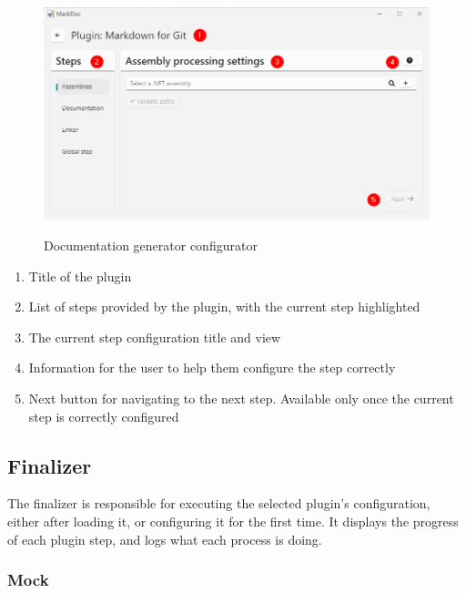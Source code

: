 \begin{figure}[H]
    \includegraphics[width=\linewidth]{img/markDocConfigurator.png}
    \label{fig:configuratorPage}
    \caption{Documentation generator configurator}
\end{figure}

\begin{enumerate}
    \item Title of the plugin
    \item List of steps provided by the plugin, with the current step highlighted
    \item The current step configuration title and view
    \item Information for the user to help them configure the step correctly
    \item Next button for navigating to the next step. Available only once the current step is correctly configured
\end{enumerate}

\subsection{Finalizer}

The finalizer is responsible for executing the selected plugin's configuration, either after loading it, or configuring it for the first time. It displays the progress of each plugin step, and logs what each process is doing.

\subsubsection{Mock}

